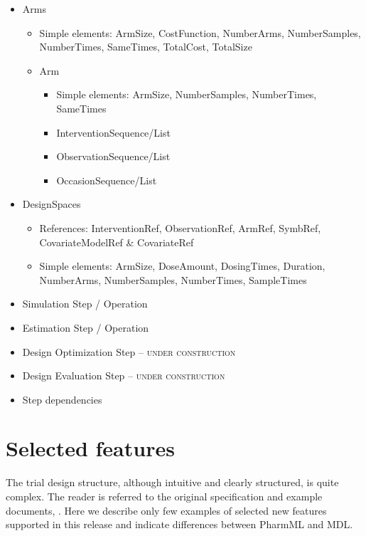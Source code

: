 \begin{minipage}{0.6\textwidth}
\begin{flushright}
\begin{itemize}
\item 
Arms
\begin{itemize}
\item 
Simple elements: ArmSize, CostFunction, NumberArms, NumberSamples, NumberTimes, SameTimes, TotalCost, TotalSize
\item 
Arm
\begin{itemize}
\item 
Simple elements: ArmSize, NumberSamples, NumberTimes, SameTimes
\item 
InterventionSequence/List
\item 
ObservationSequence/List
\item 
OccasionSequence/List
\end{itemize}
\end{itemize}
\item 
DesignSpaces
\begin{itemize}
\item 
References: InterventionRef, ObservationRef, ArmRef, SymbRef, CovariateModelRef \& CovariateRef
\item 
Simple elements: ArmSize, DoseAmount, DosingTimes, Duration, NumberArms, NumberSamples, NumberTimes, SampleTimes
\end{itemize}
\end{itemize}
\end{flushright}
{\color{red} \scshape{}}
\begin{flushleft} 
\begin{itemize}
\item 
Simulation Step / Operation
\item 
Estimation Step / Operation
\item 
Design Optimization Step -- {\color{darkgreen} \scshape{under construction}} 
\item 
Design Evaluation Step -- {\color{darkgreen} \scshape{under construction}}
\item 
Step dependencies
\end{itemize}
\end{flushleft}
\label{miniPage:comparison}
\end{minipage}



\section{Selected features}
The trial design structure, although intuitive and clearly structured,
is quite complex. The reader is referred to the original specification 
and example documents, \cite{CommetsExamples2015,Commets2015}.
Here we describe only few examples of selected new features supported in this 
release and indicate differences between PharmML and MDL.


